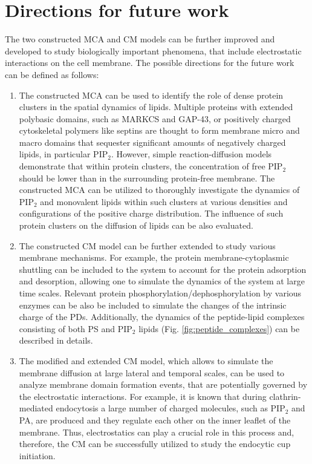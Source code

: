 \section{Directions for future work}

\label{future_directions}

The two constructed MCA and CM models can be further improved and developed to study biologically important phenomena, that include electrostatic interactions on the cell membrane. The possible directions for the future work can be defined as follows:

\begin{enumerate}
 \item The constructed MCA can be used to identify the role of dense protein clusters in the spatial dynamics of lipids. Multiple proteins with extended polybasic domains, such as MARKCS and GAP-43, or positively charged cytoskeletal polymers like septins are thought to form membrane micro and macro domains that sequester significant amounts of negatively charged lipids, in particular PIP$_2$. However, simple reaction-diffusion models demonstrate that within protein clusters, the concentration of free PIP$_2$ should be lower than in the surrounding protein-free membrane. The constructed MCA can be utilized to thoroughly investigate the dynamics of PIP$_2$ and monovalent lipids within such clusters at various densities and configurations of the positive charge distribution. The influence of such protein clusters on the diffusion of lipids can be also evaluated.
 \item The constructed CM model can be further extended to study various membrane mechanisms. For example, the protein membrane-cytoplasmic shuttling can be included to the system to account for the protein adsorption and desorption, allowing one to simulate the dynamics of the system at large time scales. Relevant protein phosphorylation/dephosphorylation by various enzymes can be also be included to simulate the changes of the intrinsic charge of the PDs. Additionally, the dynamics of the peptide-lipid complexes consisting of both PS and PIP$_2$ lipids (Fig. \ref{fig:peptide_complexes}) can be described in details.
 \item The modified and extended CM model, which allows to simulate the membrane diffusion at large lateral and temporal scales, can be used to analyze membrane domain formation events, that are potentially governed by the electrostatic interactions. For example, it is known that during clathrin-mediated endocytosis a large number of charged molecules, such as PIP$_2$ and PA, are produced and they regulate each other on the inner leaflet of the membrane. Thus, electrostatics can play a crucial role in this process and, therefore, the CM can be successfully utilized to study the endocytic cup initiation.
\end{enumerate}
